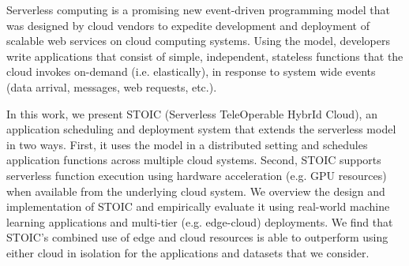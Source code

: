 Serverless computing is a promising new event-driven  programming
model that was designed by cloud vendors 
to expedite development and deployment of scalable
web services on cloud computing systems. Using the model, developers 
write applications that consist of simple, independent, stateless functions
that the cloud invokes on-demand (i.e. elastically),
in response to system wide events (data arrival, messages, web requests, etc.).

In this work, we present
STOIC (Serverless TeleOperable HybrId Cloud), an application
scheduling and deployment system that 
extends the serverless model in two ways.  First,
it uses the model in a distributed setting and schedules application
functions across multiple cloud systems.
Second, STOIC supports serverless function execution using 
hardware acceleration (e.g. GPU resources) when available from the
underlying cloud system. We overview the design and implementation
of STOIC and empirically evaluate  it 
using real-world machine learning applications and multi-tier 
(e.g. edge-cloud) deployments.  
We find that STOIC's combined use of edge and cloud resources
is able to outperform using either cloud in isolation 
for the applications and datasets that we consider.


